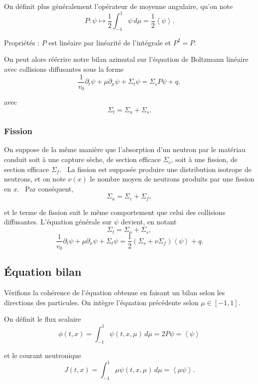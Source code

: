 \documentclass{article}
\begin{document}
On définit plus généralement l’opérateur de moyenne angulaire, qu’on note
\[
P:\psi\longmapsto \frac12\int_{-1}^1\psi\,d\mu
=\frac12\left\langle\psi\right\rangle.
\]

Propriétés : $P$ est linéaire par linéarité de l’intégrale et $P^2=P$.

On peut alors réécrire notre bilan azimutal sur l’équation de Boltzmann linéaire avec collisions diffusantes sous la forme
\begin{equation}
    \frac1{v_0}\partial_t\psi + \mu\partial_x\psi + \Sigma_t\psi =\Sigma_sP\psi+q,
\end{equation}

avec
\[\Sigma_t=\Sigma_a+\Sigma_s.\]

\subsubsection{Fission}

On suppose de la même manière que l’absorption d’un neutron par le matériau conduit soit à une capture sèche, de section efficace $\Sigma_c$, soit à une fission, de section efficace $\Sigma_f$. \
La fission est supposée produire une distribution isotrope de neutrons, et on note $\nu(x)$ le nombre moyen de neutrons produits par une fission en $x$. \
Par conséquent,
\[\Sigma_a=\Sigma_c+\Sigma_f,\]

et le terme de fission suit le même comportement que celui des collisions diffusantes. L’équation générale sur $\psi$ devient, en notant
\[ \Sigma_t=\Sigma_a+\Sigma_s, \]
\begin{equation}
    \frac1{v_0}\partial_t\psi + \mu\partial_x\psi + \Sigma_t\psi
    = \frac12(\Sigma_s+\nu\Sigma_f) \left\langle\psi\right\rangle + q.
\end{equation}

\subsection{Équation bilan}

Vérifions la cohérence de l’équation obtenue en faisant un bilan selon les directions des particules. On intègre l’équation précédente selon $\mu\in[-1,1]$.

On définit le flux scalaire
\begin{equation}
    \phi(t,x) =\int_{-1}^1 \psi(t,x,\mu)\,d\mu = 2P\psi = \left\langle\psi\right\rangle
\end{equation}

et le courant neutronique
\begin{equation}
    J(t,x) =\int_{-1}^1 \mu\psi(t,x,\mu)\,d\mu =\left\langle\mu\psi\right\rangle.
\end{equation}
\end{document}
